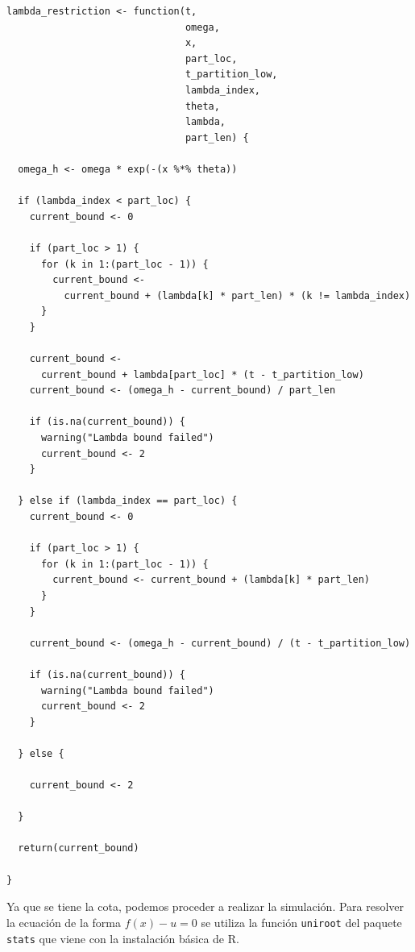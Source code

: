 \documentclass[11pt,a4paper]{article}
\begin{document}
\begin{lstlisting}
lambda_restriction <- function(t,
                               omega,
                               x,
                               part_loc,
                               t_partition_low,
                               lambda_index,
                               theta,
                               lambda,
                               part_len) {

  omega_h <- omega * exp(-(x %*% theta))

  if (lambda_index < part_loc) {
    current_bound <- 0

    if (part_loc > 1) {
      for (k in 1:(part_loc - 1)) {
        current_bound <-
          current_bound + (lambda[k] * part_len) * (k != lambda_index)
      }
    }

    current_bound <-
      current_bound + lambda[part_loc] * (t - t_partition_low)
    current_bound <- (omega_h - current_bound) / part_len

    if (is.na(current_bound)) {
      warning("Lambda bound failed")
      current_bound <- 2
    }

  } else if (lambda_index == part_loc) {
    current_bound <- 0

    if (part_loc > 1) {
      for (k in 1:(part_loc - 1)) {
        current_bound <- current_bound + (lambda[k] * part_len)
      }
    }

    current_bound <- (omega_h - current_bound) / (t - t_partition_low)

    if (is.na(current_bound)) {
      warning("Lambda bound failed")
      current_bound <- 2
    }

  } else {

    current_bound <- 2

  }

  return(current_bound)

}
\end{lstlisting}

Ya que se tiene la cota, podemos proceder a realizar la simulación. Para resolver la ecuación de la forma $f(x) - u = 0$ se utiliza la función \texttt{uniroot} del paquete \texttt{stats} que viene con la instalación básica de R.\\
\end{document}
